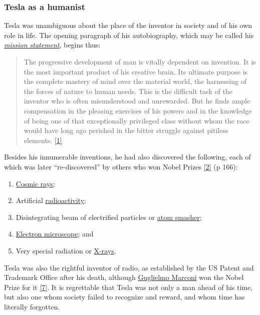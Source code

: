 \documentclass[
  a4paper,
]{article}
\providecommand{\tightlist}{%
  \setlength{\itemsep}{0pt}\setlength{\parskip}{0pt}}
\begin{document}
\hypertarget{tesla-as-a-humanist}{%
\subsubsection{Tesla as a humanist}\label{tesla-as-a-humanist}}

Tesla was unambiguous about the place of the inventor in society and of
his own role in life. The opening paragraph of his autobiography, which
may be called his
\href{https://en.wikipedia.org/wiki/Mission_statement}{\emph{mission
statement}}, begins thus:

\begin{quote}
The progressive development of man is vitally dependent on invention. It
is the most important product of his creative brain. Its ultimate
purpose is the complete mastery of mind over the material world, the
harnessing of the forces of nature to human needs. This is the difficult
task of the inventor who is often misunderstood and unrewarded. But he
finds ample compensation in the pleasing exercises of his powers and in
the knowledge of being one of that exceptionally privileged class
without whom the race would have long ago perished in the bitter
struggle against pitiless elements.
\protect\hyperlink{ref-john83}{{[}1{]}}
\end{quote}

Besides his innumerable inventions, he had also discovered the
following, each of which was later ``re-discovered'' by others who won
Nobel Prizes \protect\hyperlink{ref-oneill80}{{[}2{]}} (p 166):

\begin{enumerate}
\tightlist
\item
  \href{https://en.wikipedia.org/wiki/Cosmic_ray}{Cosmic rays};
\item
  Artificial
  \href{https://www.britannica.com/science/radioactivity}{radioactivity};
\item
  Disintegrating beam of electrified particles or
  \href{https://en.wikipedia.org/wiki/Particle_accelerator}{atom
  smasher};
\item
  \href{https://en.wikipedia.org/wiki/Electron_microscope}{Electron
  microscope}; and
\item
  Very special radiation or
  \href{https://en.wikipedia.org/wiki/X-ray}{X-rays}.
\end{enumerate}

Tesla was also the rightful inventor of radio, as established by the US
Patent and Trademark Office after his death, although
\href{https://en.wikipedia.org/wiki/Guglielmo_Marconi}{Guglielmo
Marconi} won the Nobel Prize for it
\protect\hyperlink{ref-tesla-home}{{[}7{]}}. It is regrettable that
Tesla was not only a man ahead of his time, but also one whom society
failed to recognize and reward, and whom time has literally forgotten.
\end{document}
